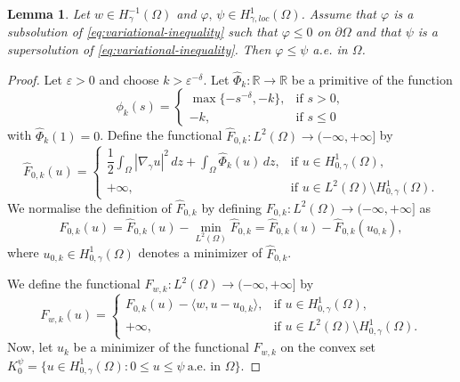 \documentclass[11pt]{article}
\newtheorem{lemma}{Lemma}[section] %
\newcommand{\om} {\Omega}
\newcommand{\gradgr}{\nabla_{\gamma}}
\newcommand{\spacegr}{H^{1}_{0,\gamma}(\Omega)}
\begin{document}
\begin{lemma}
\label{lem:comparison}
Let $w \in H^{-1}_{\gamma}(\Omega)$ and $\varphi,\, \psi \in H^{1}_{\gamma, loc}(\Omega)$. Assume that $\varphi$ is a subsolution of \eqref{eq:variational-inequality} such that $\varphi \le 0$ on $\partial\Omega$ and that $\psi$ is a supersolution of \eqref{eq:variational-inequality}. Then $\varphi \le \psi$ a.e. in $\om$.
\end{lemma}
\begin{proof}
Let $\varepsilon > 0$ and choose $k > \varepsilon^{-\delta}$. Let $\widehat{\Phi}_k : \mathbb{R} \to \mathbb{R}$ be a primitive of the function
\begin{equation*}
\phi_k(s) =
\begin{cases}
\max\{ -s^{-\delta}, -k \}, & \text{if } s > 0, \\[1ex]
-k, & \text{if } s \le 0 
\end{cases}
\end{equation*}
with $\widehat{\Phi}_k(1) = 0$. Define the functional $\widehat{F}_{0,k} : L^2(\Omega) \to (-\infty,+\infty]$ by
\begin{equation*}
\widehat{F}_{0,k}(u)
=
\begin{cases}
\dfrac12
\displaystyle
\int_\Omega |\gradgr u|^2\,dz
+
\int_\Omega \widehat{\Phi}_k(u)\,dz,
& \text{if } u \in \spacegr, \\[3ex]
+\infty,
& \text{if } u \in L^2(\Omega)\setminus \spacegr.
\end{cases}
\end{equation*}
We normalise the definition of $\widehat{F}_{0,k}$ by defining $F_{0,k} : L^2(\Omega) \to (-\infty,+\infty]$ as
\begin{equation*}
F_{0,k}(u)
=
\widehat{F}_{0,k}(u)
-
\min_{L^2(\Omega)} \widehat{F}_{0,k}
=
\widehat{F}_{0,k}(u)
-
\widehat{F}_{0,k}(u_{0,k}),
\end{equation*}
where $u_{0,k} \in \spacegr$ denotes a minimizer of $\widehat{F}_{0,k}$.

We define the functional $F_{w,k} : L^2(\Omega) \to (-\infty,+\infty]$ by
\begin{equation*}
F_{w,k}(u)
=
\begin{cases}
F_{0,k}(u) - \langle w , u - u_{0,k} \rangle,
& \text{if } u \in \spacegr, \\[1ex]
+\infty,
& \text{if } u \in L^2(\Omega)\setminus \spacegr.
\end{cases}
\end{equation*}
Now, let $u_k$ be a minimizer of the functional $F_{w,k}$ on the convex set $K_{0}^{\psi} = \bigl\{ u \in \spacegr : 0 \le u \le \psi \ \text{a.e.\ in } \Omega \bigr\}.$


\end{proof}
\end{document}
